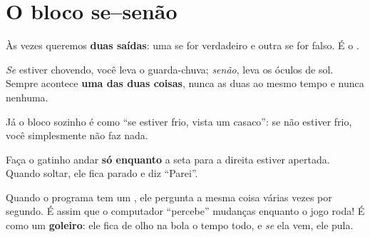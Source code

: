 \section{O bloco se--senão}

Às vezes queremos \textbf{duas saídas}: uma se for verdadeiro e outra se for falso. É o .

\begin{pensaassim}
\emph{Se} estiver chovendo, você leva o guarda-chuva; \emph{senão}, leva os óculos de sol. Sempre acontece \textbf{uma das duas coisas}, nunca as duas ao mesmo tempo e nunca nenhuma.
\end{pensaassim}

Já o bloco  sozinho é como ``se estiver frio, vista um casaco'': se não estiver frio, você simplesmente não faz nada.

\begin{codigo}
\begin{pilha}
\sbcend
\sbcend
\end{pilha}
\end{codigo}

\begin{missao}
Faça o gatinho andar \textbf{só enquanto} a seta para a direita estiver apertada. Quando soltar, ele fica parado e diz ``Parei''.
\end{missao}

\begin{codigo}
\begin{pilha}
\sbcend
\sbcend
\end{pilha}
\end{codigo}

\begin{dica}
Quando o programa tem um , ele pergunta a mesma coisa várias vezes por segundo. É assim que o computador ``percebe'' mudanças enquanto o jogo roda! É como um \textbf{goleiro}: ele fica de olho na bola o tempo todo, e \emph{se} ela vem, ele pula.
\end{dica}

